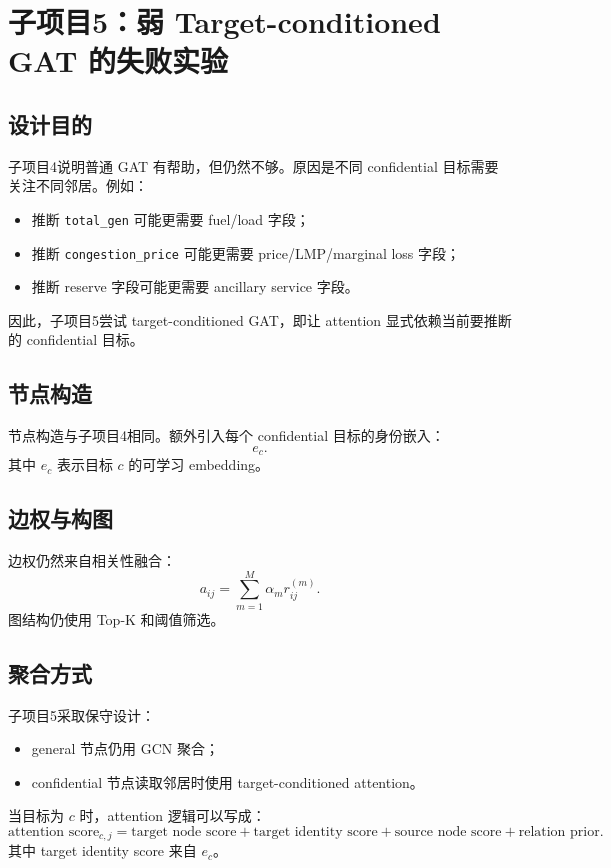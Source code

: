 \documentclass[UTF8]{ctexart}
\begin{document}
\section{子项目5：弱 Target-conditioned GAT 的失败实验}

\subsection{设计目的}

子项目4说明普通 GAT 有帮助，但仍然不够。原因是不同 confidential 目标需要关注不同邻居。例如：
\begin{itemize}
    \item 推断 \texttt{total\_gen} 可能更需要 fuel/load 字段；
    \item 推断 \texttt{congestion\_price} 可能更需要 price/LMP/marginal loss 字段；
    \item 推断 reserve 字段可能更需要 ancillary service 字段。
\end{itemize}

因此，子项目5尝试 target-conditioned GAT，即让 attention 显式依赖当前要推断的 confidential 目标。

\subsection{节点构造}

节点构造与子项目4相同。额外引入每个 confidential 目标的身份嵌入：
\[
e_c.
\]
其中 \(e_c\) 表示目标 \(c\) 的可学习 embedding。

\subsection{边权与构图}

边权仍然来自相关性融合：
\[
a_{ij}=\sum_{m=1}^{M}\alpha_m r_{ij}^{(m)}.
\]
图结构仍使用 Top-K 和阈值筛选。

\subsection{聚合方式}

子项目5采取保守设计：
\begin{itemize}
    \item general 节点仍用 GCN 聚合；
    \item confidential 节点读取邻居时使用 target-conditioned attention。
\end{itemize}

当目标为 \(c\) 时，attention 逻辑可以写成：
\[
\text{attention score}_{c,j}
=
\text{target node score}
+
\text{target identity score}
+
\text{source node score}
+
\text{relation prior}.
\]
其中 target identity score 来自 \(e_c\)。
\end{document}

